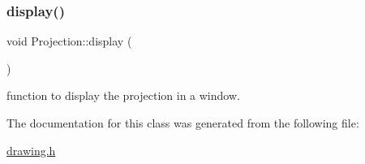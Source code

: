 \subsubsection{\texorpdfstring{display()}{display()}}
{\footnotesize\ttfamily void Projection\+::display (\begin{DoxyParamCaption}{ }\end{DoxyParamCaption})}

function to display the projection in a window. 

The documentation for this class was generated from the following file\+:\begin{DoxyCompactItemize}
\item 
\mbox{\hyperlink{drawing_8h}{drawing.\+h}}\end{DoxyCompactItemize}
